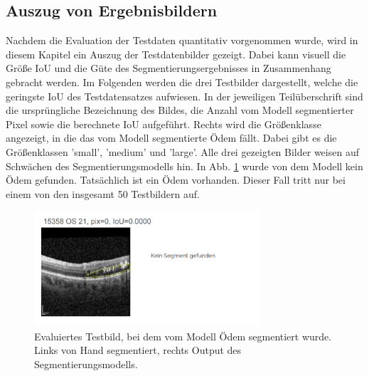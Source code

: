 \newpage
\subsection{Auszug von Ergebnisbildern}
Nachdem die Evaluation der Testdaten quantitativ vorgenommen wurde, wird in diesem Kapitel ein Auszug der Testdatenbilder gezeigt. Dabei kann visuell die Größe IoU und die Güte des Segmentierungsergebnisses in Zusammenhang gebracht werden.\newline
Im Folgenden werden die drei Testbilder dargestellt, welche die geringste IoU des Testdatensatzes aufwiesen. In der jeweiligen Teilüberschrift sind die ursprüngliche Bezeichnung des Bildes, die Anzahl vom Modell segmentierter Pixel sowie die berechnete IoU aufgeführt. Rechts wird die Größenklasse angezeigt, in die das vom Modell segmentierte Ödem fällt. Dabei gibt es die Größenklassen 'small', 'medium' und 'large'. Alle drei gezeigten Bilder weisen auf Schwächen des Segmentierungsmodells hin.\newline
In Abb. \ref{fig:ergebnis_notgood1} wurde von dem Modell kein Ödem gefunden. Tatsächlich ist ein Ödem vorhanden. Dieser Fall tritt nur bei einem von den insgesamt 50 Testbildern auf.\newline
\begin{figure}[H]
\centering
\includegraphics[width=0.75\textwidth]{./pic/Segmentierung/Segmentierungsergebnisse/1.PNG}
\caption{\label{fig:ergebnis_notgood1}Evaluiertes Testbild, bei dem vom Modell Ödem segmentiert wurde. Links von Hand segmentiert, rechts Output des Segmentierungsmodells.}
\end{figure}

